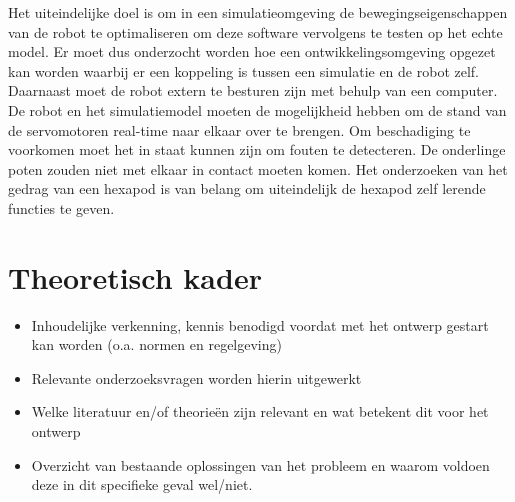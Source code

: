 \documentclass[10pt,a4paper]{article}
\begin{document}
Het uiteindelijke doel is om in een simulatieomgeving de bewegingseigenschappen van de robot te optimaliseren om deze software vervolgens te testen op het echte model. Er moet dus onderzocht worden hoe een ontwikkelingsomgeving opgezet kan worden waarbij er een koppeling is tussen een simulatie en de robot zelf. Daarnaast moet de robot extern te besturen zijn met behulp van een computer. De robot en het simulatiemodel moeten de mogelijkheid hebben om de stand van de servomotoren real-time naar elkaar over te brengen. Om beschadiging te voorkomen moet het in staat kunnen zijn om fouten te detecteren. De onderlinge poten zouden niet met elkaar in contact moeten komen. Het onderzoeken van het gedrag van een hexapod is van belang om uiteindelijk de hexapod zelf lerende functies te geven.
\newpage

\section{Theoretisch kader}
\begin{itemize}
\setlength\itemsep{0em}
\item Inhoudelijke verkenning, kennis benodigd voordat met het ontwerp gestart kan worden (o.a. normen en regelgeving)
\item Relevante onderzoeksvragen worden hierin uitgewerkt 
\item Welke literatuur en/of theorieën zijn relevant en wat betekent dit voor het ontwerp \item Overzicht van bestaande oplossingen van het probleem en waarom voldoen deze in dit specifieke geval wel/niet.
\end{itemize}
\newpage
\end{document}
